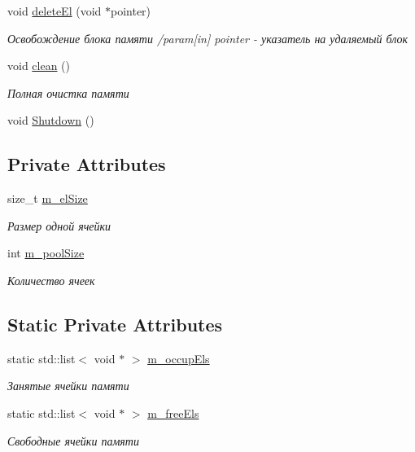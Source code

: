 \begin{DoxyCompactItemize}
void \hyperlink{class_pool_allocator_class_a5749639bd047a54ef2bf39348c3ed912}{delete\+El} (void $\ast$pointer)
\begin{DoxyCompactList}\small\item\em Освобождение блока памяти /param\mbox{[}in\mbox{]} pointer -\/ указатель на удаляемый блок \end{DoxyCompactList}\item 
void \hyperlink{class_pool_allocator_class_a23eb2eae3369c410ee6a2dbd09beea23}{clean} ()
\begin{DoxyCompactList}\small\item\em Полная очистка памяти \end{DoxyCompactList}\item 
void \hyperlink{class_pool_allocator_class_a98aa06cbb355a7cdeff4f18bc32e3532}{Shutdown} ()
\end{DoxyCompactItemize}
\subsection*{Private Attributes}
\begin{DoxyCompactItemize}
\item 
size\+\_\+t \hyperlink{class_pool_allocator_class_aa642f9cb3e6759f2acd714d9a749293b}{m\+\_\+el\+Size}
\begin{DoxyCompactList}\small\item\em Размер одной ячейки \end{DoxyCompactList}\item 
int \hyperlink{class_pool_allocator_class_ae072880ab7e4e2544be45f2d0ff540d5}{m\+\_\+pool\+Size}
\begin{DoxyCompactList}\small\item\em Количество ячеек \end{DoxyCompactList}\end{DoxyCompactItemize}
\subsection*{Static Private Attributes}
\begin{DoxyCompactItemize}
\item 
static std\+::list$<$ void $\ast$ $>$ \hyperlink{class_pool_allocator_class_aeac22ba7df2e87a1caa70f843eaba62e}{m\+\_\+occup\+Els}
\begin{DoxyCompactList}\small\item\em Занятые ячейки памяти \end{DoxyCompactList}\item 
static std\+::list$<$ void $\ast$ $>$ \hyperlink{class_pool_allocator_class_a37433e654560f47887057d6acba5f1d7}{m\+\_\+free\+Els}
\begin{DoxyCompactList}\small\item\em Свободные ячейки памяти \end{DoxyCompactList}\end{DoxyCompactItemize}


